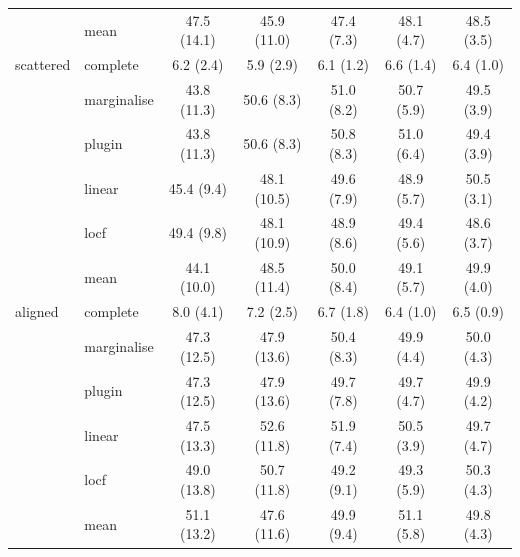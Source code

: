 \begin{table}[htbp]
\begin{tabular}{llccccc}
     & mean & 47.5 (14.1) & 45.9 (11.0) & 47.4 (7.3) & 48.1 (4.7) & 48.5 (3.5) \\
    \addlinespace
    scattered & complete & 6.2 (2.4) & 5.9 (2.9) & 6.1 (1.2) & 6.6 (1.4) & 6.4 (1.0) \\
     & marginalise & 43.8 (11.3) & 50.6 (8.3) & 51.0 (8.2) & 50.7 (5.9) & 49.5 (3.9) \\
     & plugin & 43.8 (11.3) & 50.6 (8.3) & 50.8 (8.3) & 51.0 (6.4) & 49.4 (3.9) \\
     & linear & 45.4 (9.4) & 48.1 (10.5) & 49.6 (7.9) & 48.9 (5.7) & 50.5 (3.1) \\
     & locf & 49.4 (9.8) & 48.1 (10.9) & 48.9 (8.6) & 49.4 (5.6) & 48.6 (3.7) \\
     & mean & 44.1 (10.0) & 48.5 (11.4) & 50.0 (8.4) & 49.1 (5.7) & 49.9 (4.0) \\
    \addlinespace
    aligned & complete & 8.0 (4.1) & 7.2 (2.5) & 6.7 (1.8) & 6.4 (1.0) & 6.5 (0.9) \\
     & marginalise & 47.3 (12.5) & 47.9 (13.6) & 50.4 (8.3) & 49.9 (4.4) & 50.0 (4.3) \\
     & plugin & 47.3 (12.5) & 47.9 (13.6) & 49.7 (7.8) & 49.7 (4.7) & 49.9 (4.2) \\
     & linear & 47.5 (13.3) & 52.6 (11.8) & 51.9 (7.4) & 50.5 (3.9) & 49.7 (4.7) \\
     & locf & 49.0 (13.8) & 50.7 (11.8) & 49.2 (9.1) & 49.3 (5.9) & 50.3 (4.3) \\
     & mean & 51.1 (13.2) & 47.6 (11.6) & 49.9 (9.4) & 51.1 (5.8) & 49.8 (4.3) \\
    \bottomrule
  \end{tabular}
\end{table}
